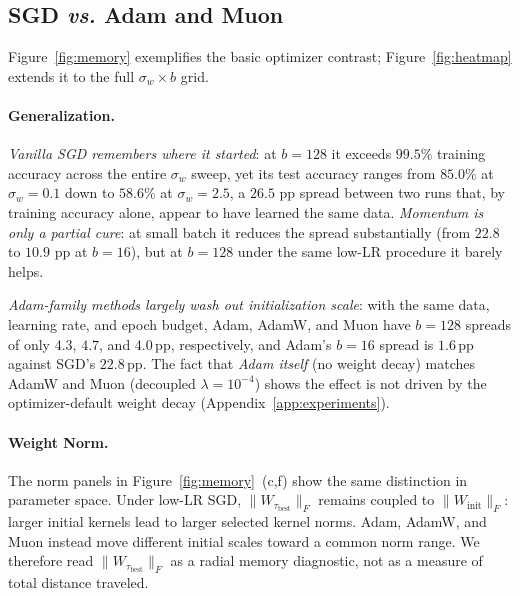 \documentclass{article}
\newcommand{\sigw}{\sigma_w}
\newcommand{\taubest}{\tau_{\mathrm{best}}}
\begin{document}
\vspace{-0.3em}
\subsection{SGD \textit{vs.} Adam and Muon}
Figure~\ref{fig:memory} exemplifies the basic optimizer contrast; Figure~\ref{fig:heatmap} extends it to the full $\sigma_w\!\times\!b$ grid.


\paragraph{Generalization.}
\textit{{Vanilla SGD remembers where it started}}: at $b=128$ it exceeds $99.5\%$ training accuracy across the entire $\sigw$ sweep, yet its test accuracy ranges from $85.0\%$ at $\sigw=0.1$ down to $58.6\%$ at $\sigw=2.5$, a $26.5$ pp spread between two runs that, by training accuracy alone, appear to have learned the same data. \textit{{Momentum is only a partial cure}}: at small batch it reduces the spread substantially (from $22.8$ to $10.9$ pp at $b=16$), but at $b=128$ under the same low-LR procedure it barely helps. 

\textit{{Adam-family methods largely wash out initialization scale}}: with the same data, learning rate, and epoch budget, Adam, AdamW, and Muon have $b{=}128$ spreads of only $4.3$, $4.7$, and $4.0$\,pp, respectively, and Adam's $b{=}16$ spread is $1.6$\,pp against SGD's $22.8$\,pp. The fact that \emph{Adam itself} (no weight decay) matches AdamW and Muon (decoupled $\lambda{=}10^{-4}$) shows the effect is not driven by the optimizer-default weight decay (Appendix~\ref{app:experiments}).

\paragraph{Weight Norm.}
The norm panels in Figure~\ref{fig:memory}~(c,f) show the same distinction in
parameter space. Under low-LR SGD, \(\|W_{\taubest}\|_F\) remains coupled to
\(\|W_{\mathrm{init}}\|_F\): larger initial kernels lead to larger selected
kernel norms. Adam, AdamW, and Muon instead move different initial scales toward
a common norm range. We therefore read \(\|W_{\taubest}\|_F\) as a radial memory
diagnostic, not as a measure of total distance traveled.



\end{document}
